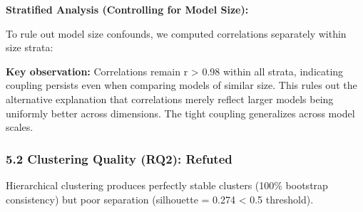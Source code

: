 \textbf{Stratified Analysis (Controlling for Model Size):}

To rule out model size confounds, we computed correlations separately within size strata:

\begin{table}[htbp]
\centering
{}
\end{table}

\textbf{Key observation:} Correlations remain r > 0.98 within all strata, indicating coupling persists even when comparing models of similar size. This rules out the alternative explanation that correlations merely reflect larger models being uniformly better across dimensions. The tight coupling generalizes across model scales.

\subsubsection{5.2 Clustering Quality (RQ2): Refuted}

Hierarchical clustering produces perfectly stable clusters (100\% bootstrap consistency) but poor separation (silhouette = 0.274 < 0.5 threshold).

\begin{table}[htbp]
\centering
{}
\end{table}

